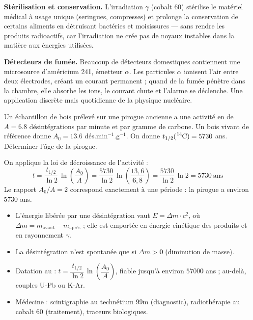 \documentclass[11pt]{article}
\begin{document}
\textbf{Stérilisation et conservation.} L'irradiation $\gamma$ (cobalt 60) stérilise le matériel médical à usage unique (seringues, compresses) et prolonge la conservation de certains aliments en détruisant bactéries et moisissures — sans rendre les produits radioactifs, car l'irradiation ne crée pas de noyaux instables dans la matière aux énergies utilisées.

\textbf{Détecteurs de fumée.} Beaucoup de détecteurs domestiques contiennent une microsource d'américium 241, émetteur $\alpha$. Les particules $\alpha$ ionisent l'air entre deux électrodes, créant un courant permanent ; quand de la fumée pénètre dans la chambre, elle absorbe les ions, le courant chute et l'alarme se déclenche. Une application discrète mais quotidienne de la physique nucléaire.

\begin{exercice}
Un échantillon de bois prélevé sur une pirogue ancienne a une activité en  de $A = \num{6,8}$ désintégrations par minute et par gramme de carbone. Un bois vivant de référence donne $A_0 = \num{13,6}$ dés.min$^{-1}$.g$^{-1}$. On donne $t_{1/2}(\ce{^{14}C}) = \num{5730}$ ans. Déterminer l'âge de la pirogue.
\end{exercice}

\begin{corrige}
On applique la loi de décroissance de l'activité :
\[
t = \frac{t_{1/2}}{\ln 2}\, \ln\!\left(\frac{A_0}{A}\right) = \frac{5730}{\ln 2}\, \ln\!\left(\frac{13,6}{6,8}\right) = \frac{5730}{\ln 2}\, \ln 2 = 5730\ \text{ans}
\]
Le rapport $A_0/A = 2$ correspond exactement à une période : la pirogue a environ $\num{5730}$ ans.
\end{corrige}

\begin{aretenir}
\begin{itemize}
\item L'énergie libérée par une désintégration vaut $E = \Delta m \cdot c^2$, où $\Delta m = m_{\text{avant}} - m_{\text{après}}$ ; elle est emportée en énergie cinétique des produits et en rayonnement $\gamma$.
\item La désintégration n'est spontanée que si $\Delta m > 0$ (diminution de masse).
\item Datation au  : $t = \dfrac{t_{1/2}}{\ln 2}\,\ln\!\left(\dfrac{A_0}{A}\right)$, fiable jusqu'à environ $\num{57000}$ ans ; au-delà, couples U-Pb ou K-Ar.
\item Médecine : scintigraphie au technétium 99m (diagnostic), radiothérapie au cobalt 60 (traitement), traceurs biologiques.
\end{itemize}
\end{aretenir}
\end{document}
